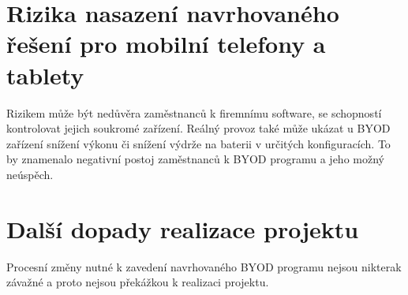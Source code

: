 \section{Rizika nasazení navrhovaného řešení pro mobilní telefony a tablety}
Rizikem může být nedůvěra zaměstnanců k firemnímu software, se schopností kontrolovat jejich soukromé zařízení. Reálný provoz také může ukázat u BYOD zařízení snížení výkonu či snížení výdrže na baterii v určitých konfiguracích. To by znamenalo negativní postoj zaměstnanců k BYOD programu a jeho možný neúspěch.

\section{Další dopady realizace projektu}
Procesní změny nutné k zavedení navrhovaného BYOD programu nejsou nikterak závažné a proto nejsou překážkou k realizaci projektu.


